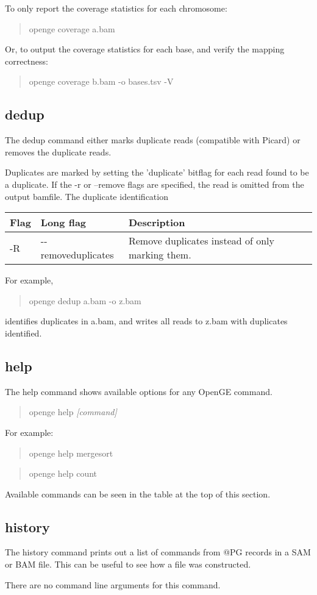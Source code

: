 \documentclass[11pt]{article}
\newcommand {\cmd}[1] {\begin{quote}#1\end{quote}}
\begin{document}
To only report the coverage statistics for each chromosome:
\cmd{openge coverage a.bam}

Or, to output the coverage statistics for each base, and verify the mapping correctness:
\cmd{openge coverage b.bam -o bases.tsv -V}

\subsection {dedup}
The dedup command either marks duplicate reads (compatible with Picard) or removes the duplicate reads. 

Duplicates are marked by setting the 'duplicate' bitflag for each read found to be a duplicate. If the -r or --remove flags are specified, the read is omitted from the output bamfile. The duplicate identification 

\begin{center}
\begin{tabular}{llp{3.5in}}
\hline
Flag&Long flag&Description\\ \hline
-R&{-}{-}removeduplicates&Remove duplicates instead of only marking them.\\
\end{tabular}
\end{center}

For example,
\cmd{openge dedup a.bam -o z.bam} 
identifies duplicates in a.bam, and writes all reads to z.bam with duplicates identified.

\subsection {help}
The help command shows available options for any OpenGE command. 

\cmd{openge help \textit{[command]}}

For example:

\cmd{openge help mergesort}

\cmd{openge help count}

Available commands can be seen in the table at the top of this section.

\subsection {history}
The history command prints out a list of commands from @PG records in a SAM or BAM file. This can be useful to see how a file was constructed.

There are no command line arguments for this command.
\end{document}
